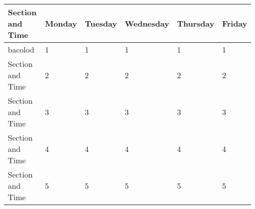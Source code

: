 \def \firstPeriod{1}
\def \secondPeriod{2}
\def \thirdPeriod{3}
\def \fourthPeriod{4}
\def \fifthPeriod{5}
\def \sixthPeriod{6}

\noindent\begin{minipage}[c]{\textwidth}
\begin{center}
  \begin{tabular}{ *{6}{|C{120pt}}|  }
    \hline
   \textbf{ Section and Time} & \textbf{Monday} & \textbf{Tuesday} & \textbf{Wednesday} & \textbf{Thursday} & \textbf{Friday} \\
    \hline
        bacolod & \firstPeriod & \firstPeriod & \firstPeriod & \firstPeriod & \firstPeriod \\
    \hline
        Section and Time & \secondPeriod & \secondPeriod & \secondPeriod & \secondPeriod & \secondPeriod \\
    \hline
        Section and Time & \thirdPeriod & \thirdPeriod & \thirdPeriod & \thirdPeriod & \thirdPeriod \\
    \hline
        Section and Time & \fourthPeriod & \fourthPeriod & \fourthPeriod & \fourthPeriod & \fourthPeriod \\
    \hline
        Section and Time & \fifthPeriod & \fifthPeriod & \fifthPeriod & \fifthPeriod & \fifthPeriod \\
  \hline
 \end{tabular}
\end{center}
\end{minipage}
